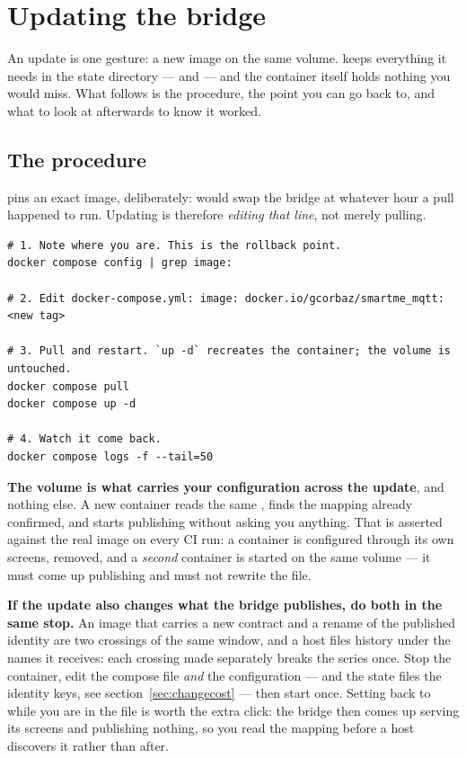\chapter{Updating the bridge}
\label{ch:update}

An update is one gesture: a new image on the same volume. \prog keeps everything it needs in
the state directory ---  and  --- and the container itself
holds nothing you would miss. What follows is the procedure, the point you can go back to, and
what to look at afterwards to know it worked.

\section{The procedure}

 pins an exact image, deliberately:  would swap the
bridge at whatever hour a pull happened to run. Updating is therefore \emph{editing that line},
not merely pulling.

\begin{lstlisting}
# 1. Note where you are. This is the rollback point.
docker compose config | grep image:

# 2. Edit docker-compose.yml: image: docker.io/gcorbaz/smartme_mqtt:<new tag>

# 3. Pull and restart. `up -d` recreates the container; the volume is untouched.
docker compose pull
docker compose up -d

# 4. Watch it come back.
docker compose logs -f --tail=50
\end{lstlisting}

\begin{note}
\textbf{The volume is what carries your configuration across the update}, and nothing else. A
new container reads the same , finds the mapping already confirmed, and
starts publishing without asking you anything. That is asserted against the real image on every
CI run: a container is configured through its own screens, removed, and a \emph{second}
container is started on the same volume --- it must come up publishing and must not rewrite the
file.
\end{note}

\begin{note}
\textbf{If the update also changes what the bridge publishes, do both in the same stop.} An image
that carries a new contract and a rename of the published identity are two crossings of the same
window, and a host files history under the names it receives: each crossing made separately breaks
the series once. Stop the container, edit the compose file \emph{and} the configuration --- and the
state files the identity keys, see section~\ref{sec:changecost} --- then start once. Setting
 back to  while you are in the file is worth the extra click:
the bridge then comes up serving its screens and publishing nothing, so you read the mapping before
a host discovers it rather than after.
\end{note}

